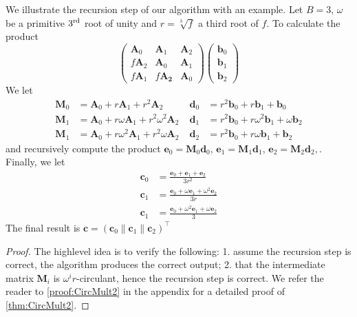 \begin{example}
    We illustrate the recursion step of our algorithm with an example. Let \(B=3\), \(\omega\) be a primitive \(3\textsuperscript{rd}\) root of unity and \(r = \sqrt[3]{f}\) a third root of \(f\). To calculate the product
    \[\begin{pmatrix}
        \bm{A}_0 & \bm{A}_1 & \bm{A}_2 \\
        f \bm{A}_2 & \bm{A}_0 & \bm{A}_1 \\
        f \bm{A}_1 & f \bm{A_2} & \bm{A}_0
    \end{pmatrix} \begin{pmatrix}
        \bm{b}_0 \\ \bm{b}_1 \\ \bm{b}_2
    \end{pmatrix}\]
    We let
    \begin{align*}
        \bm{M}_0 &= \bm{A}_0 + r \bm{A}_1 + r^2 \bm{A}_2 \; & \bm{d}_0 &= r^2 \bm{b}_0 + r \bm{b}_1 + \bm{b}_0 \\
        \bm{M}_1 &= \bm{A}_0 + r \omega \bm{A}_1 + r^2 \omega^2 \bm{A}_2 \; & \bm{d}_1 &= r^2 \bm{b}_0 + r \omega^2 \bm{b}_1 + \omega \bm{b}_2 \\
        \bm{M}_1 &= \bm{A}_0 + r \omega^2 \bm{A}_1 + r^2 \omega \bm{A}_2 \; & \bm{d}_2 &= r^2 \bm{b}_0 + r \omega \bm{b}_1 + \bm{b}_2
    \end{align*}
    and recursively compute the product \(\bm{e}_0 = \bm{M}_0 \bm{d}_0,\, \bm{e}_1 = \bm{M}_1 \bm{d}_1,\, \bm{e}_2 = \bm{M}_2 \bm{d}_2,\). Finally, we let
    \begin{align*}
        \bm{c}_0 &= \frac{\bm{e}_0 + \bm{e}_1 + \bm{e}_2}{3r^2} \\
        \bm{c}_1 &= \frac{\bm{e}_0 + \omega \bm{e}_1 + \omega^2 \bm{e}_2}{3r} \\
        \bm{c}_1 &= \frac{\bm{e}_0 + \omega^2 \bm{e}_1 + \omega \bm{e}_2}{3}
    \end{align*}
    The final result is \(\bm{c} = (\bm{c}_0 \parallel \bm{c}_1 \parallel \bm{c}_2)^{\top}\)
\end{example}
\else
\begin{proof}
    The highlevel idea is to verify the following: 1. assume the recursion step is correct, the algorithm produces the correct output; 2. that the intermediate matrix \(\bm{M}_i\) is \(\omega^i r\)-circulant, hence the recursion step is correct. We refer the reader to \cref{proof:CircMult2} in the appendix for a detailed proof of \cref{thm:CircMult2}.
\end{proof}
\fi

